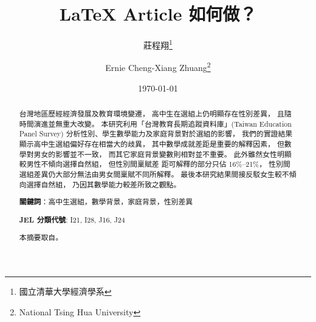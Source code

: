 \documentclass[utf8,12pt]{article} %
\title{\LaTeX{}  Article 如何做？}
\author{莊程翔\thanks{國立清華大學經濟學系} \and Ernie Cheng-Xiang Zhuang\thanks{National Tsing Hua University}}
\date{\today}
\begin{document}

%
\maketitle 
%
%
\begin{abstract}\fontsize{12}{20pt}
\begin{spacing}{1.5}
台灣地區歷經經濟發展及教育環境變遷，
高中生在選組上仍明顯存在性別差異，
且隨時間演進並無重大改變。
本研究利用「台灣教育長期追蹤資料庫」(Taiwan Education Panel Survey) 分析性別、學生數學能力及家庭背景對於選組的影響，
我們的實證結果顯示高中生選組偏好存在相當大的歧異，
其中數學成就差距是重要的解釋因素，
但數學對男女的影響並不一致，
而其它家庭背景變數則相對並不重要。
此外雖然女性明顯較男性不傾向選擇自然組，
但性別間稟賦差 距可解釋的部分只佔 16\%–21\%，
性別間選組差異仍大部分無法由男女間稟賦不同所解釋。
最後本研究結果間接反駁女生較不傾向選擇自然組，
乃因其數學能力較差所致之觀點。

\bigskip
\noindent
\textbf{關鍵詞}：高中生選組，數學背景，家庭背景，性別差異

\bigskip
\noindent
\textbf{JEL 分類代號}: I21, I28, J16, J24

\bigskip
\noindent
本摘要取自\href{https://econ.ntu.edu.tw/ter/new/data/new/TER394/TER394-4.pdf}{\citet{Guo2011}}。
\end{spacing}
\end{abstract}
%
%
\newpage
\fontsize{12}{20pt}
\begin{spacing}{1.5}
\tableofcontents
%
\newpage
\listoffigures
%
\newpage
\listoftables
%
\end{spacing}
%
%
\newpage
{} %
\end{document}
